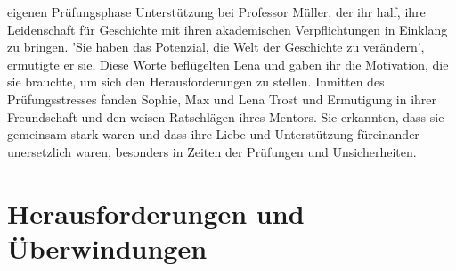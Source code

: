 \documentclass[12pt]{article} %
\begin{document}
eigenen Prüfungsphase Unterstützung bei Professor Müller, der ihr half, ihre Leidenschaft für Geschichte mit ihren akademischen Verpflichtungen in Einklang zu bringen. 'Sie haben das Potenzial, die Welt der Geschichte zu verändern', ermutigte er sie. Diese Worte beflügelten Lena und gaben ihr die Motivation, die sie brauchte, um sich den Herausforderungen zu stellen. Inmitten des Prüfungsstresses fanden Sophie, Max und Lena Trost und Ermutigung in ihrer Freundschaft und den weisen Ratschlägen ihres Mentors. Sie erkannten, dass sie gemeinsam stark waren und dass ihre Liebe und Unterstützung füreinander unersetzlich waren, besonders in Zeiten der Prüfungen und Unsicherheiten.

\section{ Herausforderungen und Überwindungen }
\end{document}
